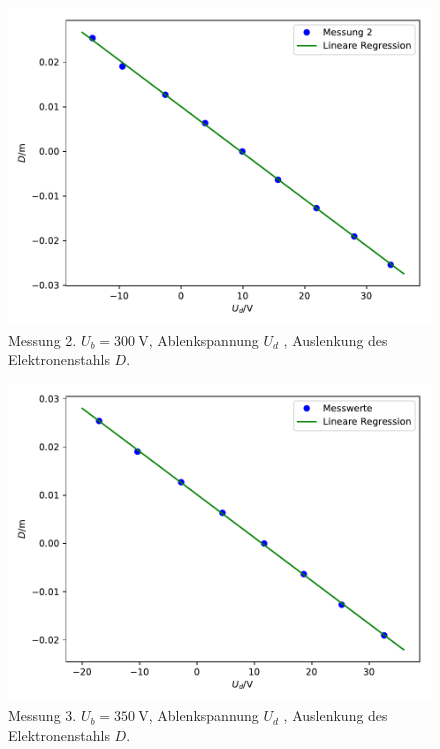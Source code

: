 \begin{figure}
  \centering
  \includegraphics[scale=0.7]{Plot1.2.pdf}
  \caption{Messung 2. $U_b = \SI{300}{\volt}$, Ablenkspannung $U_d$ , Auslenkung des Elektronenstahls $D$.}
  \label{abb:2}
\end{figure}

\begin{figure}
  \centering
  \includegraphics[scale=0.7]{Plot1.3.pdf}
  \caption{Messung 3. $U_b = \SI{350}{\volt}$, Ablenkspannung $U_d$ , Auslenkung des Elektronenstahls $D$.}
  \label{abb:3}
\end{figure}

